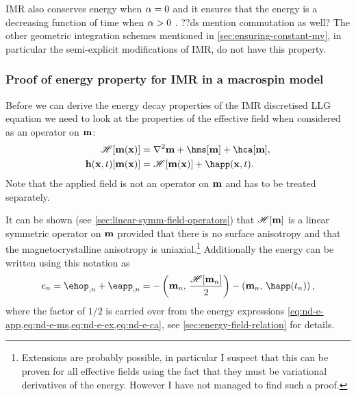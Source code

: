IMR also conserves energy when $\alpha = 0$ and it ensures that the energy is a decreasing function of time when $\alpha > 0$ \cite{DAquino2005}.
??ds mention commutation as well?
The other geometric integration schemes mentioned in \cref{sec:ensuring-constant-mv}, in particular the semi-explicit modifications of IMR, do not have this property.


\subsubsection{Proof of energy property for IMR in a macrospin model}
\label{sec:proof-energy-prop}

\newcommand{\happerror}{\mathcal{E}_\text{ap}}

Before we can derive the energy decay properties of the IMR discretised LLG equation we need to look at the properties of the effective field when considered as an operator on $\mathbf{m}$:
\begin{equation}
  \begin{aligned}
    \label{eq:hop}
    \hop [\mv(\xv)] &= \lap \mv + \hms[\mv] + \hca[\mv], \\
    \hv(\xv, t)[\mv(\xv)] &= \hop [\mv(\xv)] + \happ(\xv, t). \\
  \end{aligned}
\end{equation}
Note that the applied field is not an operator on $\mathbf{m}$ and has to be treated separately.

It can be shown (see \cref{sec:linear-symm-field-operators}) that $\mathscr{H}[\mathbf{m}]$ is a linear symmetric operator on $\mathbf{m}$ provided that there is no surface anisotropy and that the magnetocrystalline anisotropy is uniaxial.\footnote{Extensions are probably possible, in particular I suspect that this can be proven for all effective fields using the fact that they must be variational derivatives of the energy.
However I have not managed to find such a proof.}
Additionally the energy can be written using this notation as
\begin{equation}
  \label{eq:energy-hop}
  \e_n = \ehop_{,n} + \eapp_{,n} = - \ip{\mv_n}{\frac{\hop[\mv_n]}{2}} - \ip{\mv_n}{\happ(t_n)},
\end{equation}
where the factor of $1/2$ is carried over from the energy expressions \cref{eq:nd-e-app,eq:nd-e-ms,eq:nd-e-ex,eq:nd-e-ca}, see \cref{sec:energy-field-relation} for details.

